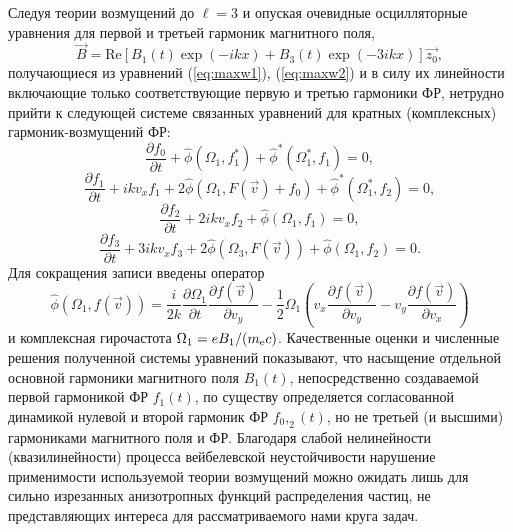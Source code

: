 Следуя теории возмущений до $\ell = 3$ и опуская очевидные осцилляторные уравнения для первой и третьей гармоник магнитного поля,
\begin{equation}
    \vec{B} = \mathrm{Re} \left[ B_1(t) \exp(-ikx)+B_3(t)\exp(-3ikx) \right] \vec{z_0} ,
\end{equation}
получающиеся из уравнений (\ref{eq:maxw1}), (\ref{eq:maxw2}) и в силу их линейности включающие только соответствующие первую и третью гармоники ФР, нетрудно прийти к следующей системе связанных уравнений для кратных (комплексных) гармоник-возмущений ФР:
\begin{equation}
    \dfrac{\partial f_0}{\partial t}+\hat \phi(\Omega_1,f_1^*)+\hat \phi^*(\Omega_1^*,f_1)=0 ,
\label{eq6}
\end{equation}
\begin{equation}
    \dfrac{\partial f_1}{\partial t}+ikv_xf_1+2\hat \phi(\Omega_1,F(\vec{v})+f_0)+\hat \phi^*(\Omega_1^*,f_2)=0 ,
\label{eq7}
\end{equation}
\begin{equation}
    \dfrac{\partial f_2}{\partial t}+2ikv_xf_2+\hat \phi(\Omega_1,f_1)=0 ,
\label{eq8}
\end{equation}
\begin{equation}
    \dfrac{\partial f_3}{\partial t}+3ikv_xf_3+2\hat \phi(\Omega_3,F(\vec{v}))+\hat \phi(\Omega_1,f_2)=0 .
\label{eq9}
\end{equation}
Для сокращения записи введены оператор
\begin{equation}
    \hat \phi(\Omega_{1},f(\vec{v}))=\dfrac{i}{2k}\dfrac{\partial\Omega_{1}}{\partial t} \dfrac{\partial f(\vec{v})}{\partial v_y}-\dfrac{1}{2}\Omega_{1} \left(v_x\dfrac{\partial f(\vec{v})}{\partial v_y}-v_y\dfrac{\partial f(\vec{v})}{\partial v_x}\right) 
\label{eq12}
\end{equation}
и комплексная гирочастота $\Omega_1={e B_1}/{(m_\mathrm{e} c)}$. Качественные оценки и численные решения полученной системы уравнений показывают, что насыщение отдельной основной гармоники магнитного поля $B_1(t)$, непосредственно создаваемой первой гармоникой ФР $f_1(t)$, по существу определяется согласованной динамикой нулевой и второй гармоник ФР $f_0,_2(t)$, но не третьей (и высшими) гармониками магнитного поля и ФР. Благодаря слабой нелинейности (квазилинейности) процесса вейбелевской неустойчивости нарушение применимости используемой теории возмущений можно ожидать лишь для сильно изрезанных анизотропных функций распределения частиц, не представляющих интереса для рассматриваемого нами круга задач.


